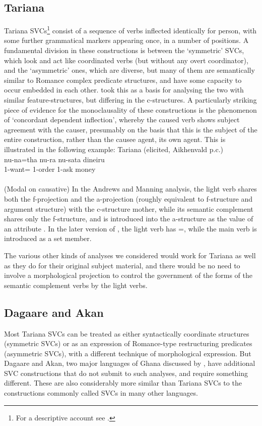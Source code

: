 \documentclass[output=paper,hidelinks]{langscibook}
\begin{document}
\subsection{Tariana}
Tariana SVCs\footnote
 {For a descriptive account see \citet{Aikhenvald2003,Aikhenvald2006tar}.}
consist of a sequence of verbs inflected identically for person, with some further grammatical markers
appearing once, in a number of positions.  A fundamental division in these constructions
is between the `symmetric' SVCs, which look and act like coordinated verbs (but without
any overt coordinator), and the `asymmetric' ones, which are diverse, but many of them
are semantically similar to Romance complex predicate structures, and have some
capacity to occur embedded in each other. \citet{AndrewsManning1999} took this as a basis for
analysing the two with similar
feature-structures, but differing in the c-structures.  A particularly striking piece
of evidence for the monoclausality of these constructions is the phenomenon of
`concordant dependent inflection', whereby the caused verb shows subject agreement
with the causer, presumably on the basis that this is the subject of the entire construction,
rather than the causee agent, its own agent.  This is illustrated
in the following example:
\ea Tariana (elicited, Aikhenvald p.c.)\\
\gll  nu-na=tha       nu-ra           nu-sata  dineiru\\
        1\SG-want= 1\SG-order 1\SG-ask money\\
\\
(Modal on causative)
\z
In the Andrews and Manning analysis, the light verb shares both the f-projection and the
a-projection (roughly equivalent to f-structure and argument structure) with the c-structure mother,
while its semantic complement shares only the f-structure, and is introduced into the
a-structure as the value of an attribute {\ARG}.  In the later version of
\citet{Andrews2018mapps}, the light verb has {\UP=\DOWN}, while the main verb
is introduced as a set member.  

The various other kinds of analyses we considered would work for Tariana as well as
they do for their original subject material, and  there would be
no need to involve a morphological projection to
control the government of the forms of the semantic complement verbs by the light verbs.

\subsection{Dagaare and Akan}
Most Tariana SVCs can be treated as either syntactically coordinate
structures (symmetric SVCs) or as an expression of Romance-type
restructuring predicates (asymmetric SVCs), with a different technique
of morphological expression.  But Dagaare and Akan, two major
languages of Ghana discussed by \citet{Bodomo1996,Bodomo1997}, have
additional SVC constructions that do not submit to such analyses, and
require something different.  These are also considerably more similar
than Tariana SVCs to the constructions commonly called SVCs in many
other languages.
\end{document}
